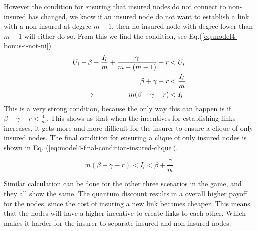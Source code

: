 However the condition for ensuring that insured nodes do not connect to non-insured has changed, we know if an insured node do not want to establish a link with a non-insured at degree $m-1$, then no insured node with degree lower than $m-1$ will either do so. From this we find the condition, see Eq.(\ref{eq:model4-bonus-i-not-ni})
\begin{eqnarray}
U_{i}+\beta-\frac{I_{l}}{m}+\frac{\gamma}{m-(m-1)}-r&<U_{i} \nonumber \\ 
\beta+\gamma-r&<\frac{I_{l}}{m}\nonumber \\ 
\llap{$\rightarrow$\hspace{50pt}}m(\beta +\gamma-r)&<I_{l}\nonumber
\label{eq:model4-bonus-i-not-ni}
\end{eqnarray}
This is a very strong condition, because the only way this can happen is if $\beta+\gamma-r<\frac{1}{m}$.  This shows us that when the incentives for establishing links increases, it gets more and more difficult for the insurer to ensure a clique of only insured nodes. 
The final condition for ensuring a clique of only insured nodes is shown in Eq. (\ref{eq:model4-final-condition-insured-clique}).

\begin{equation}
m(\beta +\gamma-r)<I_{l}<\beta+\frac{\gamma}{m}
\label{eq:model4-final-condition-insured-clique}
\end{equation}

Similar calculation can be done for the other three scenarios in the game, and they all show the same. The quantum discount results in a overall higher payoff for the nodes, since the cost of insuring a new link becomes cheaper. This means that the nodes will have a higher incentive to create links to each other. Which makes it harder for the insurer to separate insured and non-insured nodes.









